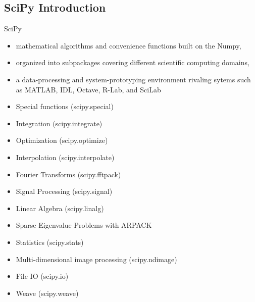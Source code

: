 \subsection{SciPy Introduction}

\begin{frame}
SciPy
\begin{itemize}
\item mathematical algorithms and convenience functions built on the Numpy,
\item organized into subpackages covering different scientific computing domains,
\item a data-processing and system-prototyping environment rivaling sytems such as MATLAB, IDL, Octave, R-Lab, and SciLab
\end{itemize}
\end{frame}

\begin{frame}
\begin{itemize}
\item Special functions (scipy.special)
\item Integration (scipy.integrate)
\item Optimization (scipy.optimize)
\item Interpolation (scipy.interpolate)
\item Fourier Transforms (scipy.fftpack)
\item Signal Processing (scipy.signal)
\item Linear Algebra (scipy.linalg)
\item Sparse Eigenvalue Problems with ARPACK
\item Statistics (scipy.stats)
\item Multi-dimensional image processing (scipy.ndimage)
\item File IO (scipy.io)
\item Weave (scipy.weave)
\end{itemize}
\end{frame}
